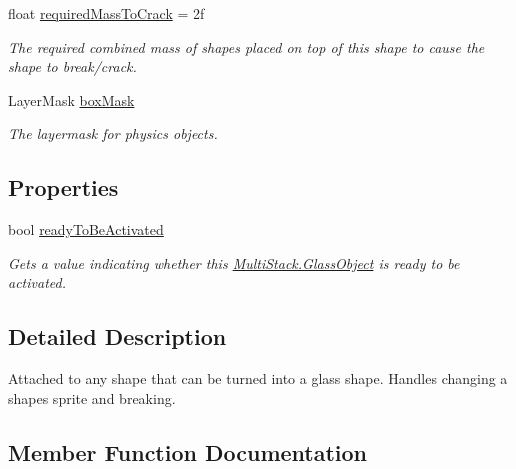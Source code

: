 \begin{DoxyCompactItemize}
float \hyperlink{class_multi_stack_1_1_glass_object_ac93340a7501f7e1db6dcffef8dea24ea}{required\+Mass\+To\+Crack} = 2f
\begin{DoxyCompactList}\small\item\em The required combined mass of shapes placed on top of this shape to cause the shape to break/crack. \end{DoxyCompactList}\item 
Layer\+Mask \hyperlink{class_multi_stack_1_1_glass_object_abce95b7ebe64b863239f56468071187b}{box\+Mask}
\begin{DoxyCompactList}\small\item\em The layermask for physics objects. \end{DoxyCompactList}\end{DoxyCompactItemize}
\subsection*{Properties}
\begin{DoxyCompactItemize}
\item 
bool \hyperlink{class_multi_stack_1_1_glass_object_a4ab5c37980ecdeea3986f7075c7ea6aa}{ready\+To\+Be\+Activated}
\begin{DoxyCompactList}\small\item\em Gets a value indicating whether this \hyperlink{class_multi_stack_1_1_glass_object}{Multi\+Stack.\+Glass\+Object} is ready to be activated. \end{DoxyCompactList}\end{DoxyCompactItemize}


\subsection{Detailed Description}
Attached to any shape that can be turned into a glass shape. Handles changing a shapes sprite and breaking. 



\subsection{Member Function Documentation}
\hypertarget{class_multi_stack_1_1_glass_object_a7cc0399f29ea62b202cfaf8df9438bad}{}
